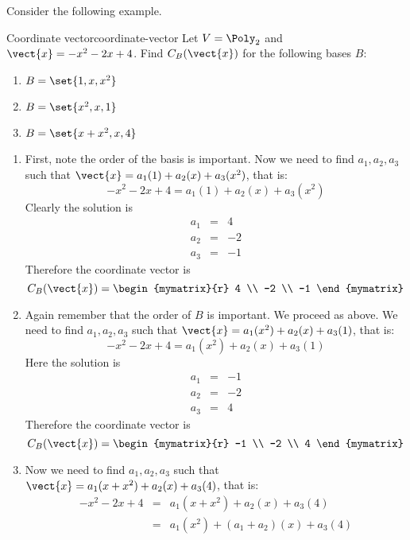 Consider the following example.

\begin{example}{Coordinate vector}{coordinate-vector}
Let $V = \Poly_2$ and $\vect{x} = -x^2 -2x + 4$.
Find $C_B(\vect{x})$ for the following bases $B$:
\begin{enumerate}
\item $B = \set{1, x, x^2 }$
\item $B = \set{x^2, x, 1 }$
\item $B = \set{x + x^2 , x , 4 }$
\end{enumerate}
\end{example}

\begin{solution}
\begin{enumerate}
\item
First, note the order of the basis is important.
Now we need to find $a_1, a_2, a_3$ such that $\vect{x} = a_1 (1) + a_2 (x) + a_3(x^2)$, that is:
\[
-x^2 -2x + 4 = a_1 (1) + a_2 (x) + a_3(x^2)
\]
Clearly the solution is
\begin{eqnarray*}
a_1 &=& 4 \\
a_2 &=& -2 \\
a_3 &=& -1
\end{eqnarray*}
Therefore the coordinate vector is
\[
C_B(\vect{x}) =
\begin{mymatrix}{r}
4 \\
-2 \\
-1
\end{mymatrix}
\]

\item
Again remember that the order of $B$ is important. We proceed as above.
We need to find $a_1, a_2, a_3$ such that $\vect{x} = a_1 (x^2) + a_2 (x) + a_3(1)$, that is:
\[
-x^2 -2x + 4 = a_1 (x^2) + a_2 (x) + a_3(1)
\]
Here the solution is
\begin{eqnarray*}
a_1 &=& -1 \\
a_2 &=& -2 \\
a_3 &=& 4
\end{eqnarray*}
Therefore the coordinate vector is
\[
C_B(\vect{x}) =
\begin{mymatrix}{r}
-1 \\
-2 \\
4
\end{mymatrix}
\]

\item
Now we need to find $a_1, a_2, a_3$ such that $\vect{x} = a_1 (x + x^2) + a_2 (x) + a_3(4)$, that is:
\begin{eqnarray*}
-x^2 -2x + 4 &=& a_1 (x + x^2 ) + a_2 (x) + a_3(4)\\
&=& a_1 (x^2) + (a_1 + a_2) (x) + a_3(4)
\end{eqnarray*}


\end{enumerate}
\end{solution}
